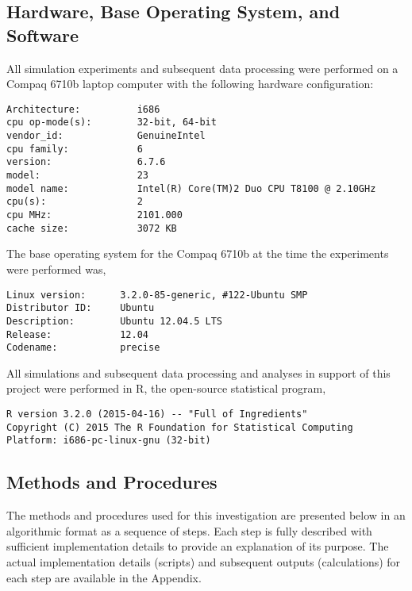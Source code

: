 \documentclass[letter,11pt]{article}
\begin{document}
\subsection{Hardware, Base Operating System, and Software}
All simulation experiments and subsequent data processing were performed on a Compaq 6710b laptop computer with the following hardware configuration: 
\begin{verbatim}
Architecture:          i686
cpu op-mode(s):        32-bit, 64-bit
vendor_id:             GenuineIntel
cpu family:            6
version:               6.7.6
model:                 23
model name:            Intel(R) Core(TM)2 Duo CPU T8100 @ 2.10GHz
cpu(s):                2
cpu MHz:               2101.000
cache size:            3072 KB
\end{verbatim}

The base operating system for the Compaq 6710b at the time the experiments were performed was,
\begin{verbatim}
Linux version:      3.2.0-85-generic, #122-Ubuntu SMP 
Distributor ID:     Ubuntu
Description:        Ubuntu 12.04.5 LTS
Release:            12.04
Codename:           precise
\end{verbatim}

All simulations and subsequent data processing and analyses in support of this project were performed in R, the open-source statistical program, 
\begin{verbatim}
R version 3.2.0 (2015-04-16) -- "Full of Ingredients"
Copyright (C) 2015 The R Foundation for Statistical Computing
Platform: i686-pc-linux-gnu (32-bit)
\end{verbatim}

\subsection{Methods and Procedures}
The methods and procedures used for this investigation are presented below in an algorithmic format as a sequence of steps. Each step is fully described with sufficient implementation details to provide an explanation of its purpose. The actual implementation details (scripts) and subsequent outputs (calculations) for each step are available in the Appendix.
\end{document}
